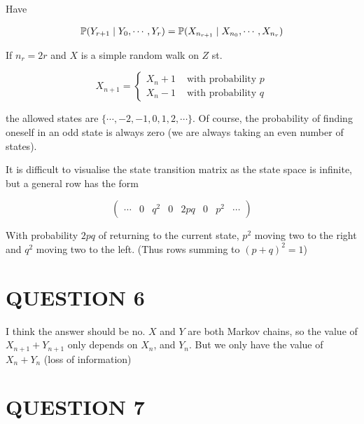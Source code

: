 \documentclass[a4paper]{article}
\begin{document}
Have

\begin{align*}
\P(Y_{r+1}  \; | \; Y_{0},\cdots,Y_{r} ) & = \P(X_{n_{r+1}} \; | \; X_{n_{0}},\cdots,X_{n_{r}}  ) \\
\end{align*}

If $ n_{r} = 2r $ and $ X $ is a simple random walk on $ Z $ st. 

\[ X_{n+1} = \begin{cases} X_{n} + 1 & \text{ with probability } p \\ X_{n} - 1 & \text{ with probability } q \end{cases} \] 

the allowed states are $ \{ \cdots,-2,-1,0,1,2,\cdots \} $. Of course, the probability of finding oneself in an odd state is always zero (we are always taking an even number of states).

It is difficult to visualise the state transition matrix as the state space is infinite, but a general row has the form

\[ \begin{pmatrix}
\cdots & 0 & q^{2} & 0 & 2pq & 0 & p^{2} & \cdots
\end{pmatrix} \]

With probability $ 2pq $ of returning to the current state, $ p^{2} $ moving two to the right and $ q^{2} $ moving two to the left. (Thus rows summing to $ (p + q)^{2} = 1 $)




\section{QUESTION 6}

I think the answer should be no. $ X $ and $ Y $ are both Markov chains, so the value of $ X_{n+1} + Y_{n+1} $ only depends on $ X_{n} $, and $ Y_{n} $. But we only have the value of $ X_{n} + Y_{n} $ (loss of information)

\section{QUESTION 7}
\end{document}

